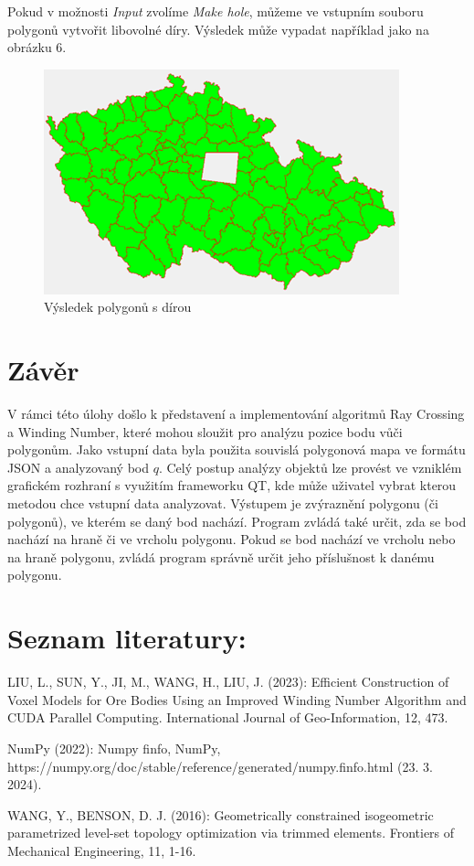 \documentclass{article}
\begin{document}
\begin{spacing}{1.5}
Pokud v možnosti \textit{Input} zvolíme \textit{Make hole}, můžeme ve vstupním souboru polygonů vytvořit libovolné díry. Výsledek může vypadat například jako na obrázku 6.

\begin{figure}[h]
    \centering
    \includegraphics[width=0.6\linewidth]{images/app04.png}
    \caption{Výsledek polygonů s dírou}
    \label{fig:enter-label}
\end{figure}

\section{Závěr}
V rámci této úlohy došlo k představení a implementování algoritmů Ray Crossing a Winding Number, které mohou sloužit pro analýzu pozice bodu vůči polygonům. Jako vstupní data byla použita souvislá polygonová mapa ve formátu JSON a analyzovaný bod $q$. Celý postup analýzy objektů lze provést ve vzniklém grafickém rozhraní s využitím frameworku QT, kde může uživatel vybrat kterou metodou chce vstupní data analyzovat. Výstupem je zvýraznění polygonu (či polygonů), ve kterém se daný bod nachází. Program zvládá také určit, zda se bod nachází na hraně či ve vrcholu polygonu. Pokud se bod nachází ve vrcholu nebo na hraně polygonu, zvládá program správně určit jeho příslušnost k danému polygonu.


\newpage
\section*{Seznam literatury: }
LIU, L., SUN, Y., JI, M., WANG, H., LIU, J. (2023): Efficient Construction of Voxel Models for Ore Bodies Using an Improved Winding Number Algorithm and CUDA Parallel Computing. International Journal of Geo-Information, 12, 473.

\vspace*{0.5cm}
\noindent NumPy (2022): Numpy finfo, NumPy, https://numpy.org/doc/stable/reference/generated/numpy.finfo.html
(23. 3. 2024).

\vspace*{0.5cm}
\noindent WANG, Y., BENSON, D. J. (2016): Geometrically constrained isogeometric parametrized level-set topology optimization via trimmed elements. Frontiers of Mechanical Engineering, 11, 1-16. 

\end{spacing}
\end{document}
